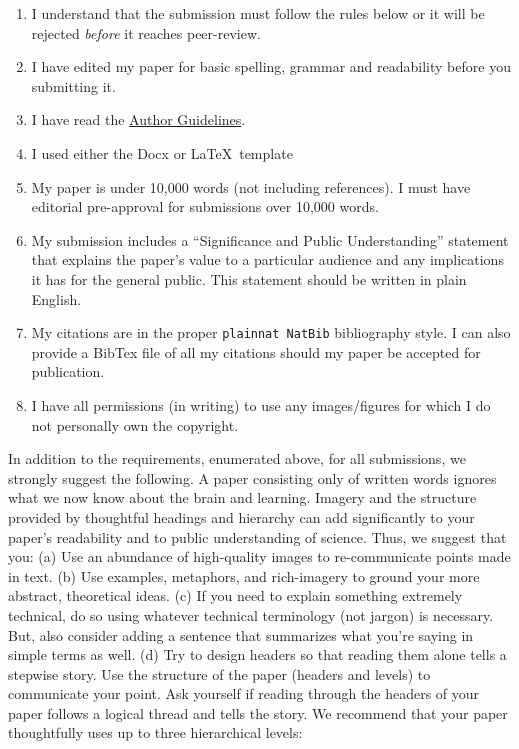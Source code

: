 \documentclass{tufte-handout}
\begin{document}
\begin{enumerate}
\item I understand that the submission must follow the rules below or it will be rejected \textit{before} it reaches peer-review.
\item I have edited my paper for basic spelling, grammar and readability before you submitting it.
\item I have read the \href{https://journalofsystemsthinking.org/index.php/jost/about/submissions#authorGuidelines}{Author Guidelines}.
\item I used either the Docx or \LaTeX\ template
\item My paper is under 10,000 words (not including references). I must have editorial pre-approval for submissions over 10,000 words.
\item My submission includes a “Significance and Public Understanding” statement that explains the paper's value to a particular audience and any implications it has for the general public. This statement should be written in plain English.
\item My citations are in the proper \Verb|plainnat NatBib| bibliography style. I can also provide a BibTex file of all my citations should my paper be accepted for publication.
\item I have all permissions (in writing) to use any images/figures for which I do not personally own the copyright.
\end{enumerate}

In addition to the requirements, enumerated above, for all submissions, we strongly suggest the following. A paper consisting only of written words ignores what we now know about the brain and learning. Imagery and the structure provided by thoughtful headings and hierarchy can add significantly to your paper's readability and to public understanding of science. Thus, we suggest that you: (a) Use an abundance of high-quality images to re-communicate points made in text. (b) Use examples, metaphors, and rich-imagery to ground your more abstract, theoretical ideas. (c) If you need to explain something extremely technical, do so using whatever technical terminology (not jargon) is necessary. But, also consider adding a sentence that summarizes what you’re saying in simple terms as well. (d) Try to design headers so that reading them alone tells a stepwise story. Use the structure of the paper (headers and levels) to communicate your point. Ask yourself if reading through the headers of your paper follows a logical thread and tells the story. We recommend that your paper thoughtfully uses up to three hierarchical levels:
\end{document}
